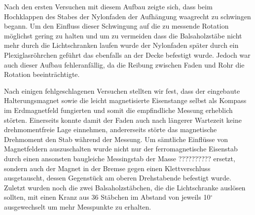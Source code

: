 \documentclass[11pt]{scrartcl}
\begin{document}
Nach den ersten Versuchen mit diesem Aufbau zeigte sich, dass beim Hochklappen des Stabes der Nylonfaden der Aufh\"angung waagrecht zu schwingen begann. Um den Einfluss dieser Schwingung auf die zu messende Rotation m\"oglichst gering zu halten und um zu vermeiden dass die Balsaholzst\"abe nicht mehr durch die Lichtschranken laufen wurde der Nylonfaden sp\"ater durch ein Plexiglasr\"ohrchen gef\"uhrt das ebenfalls an der Decke befestigt wurde. Jedoch war auch dieser Aufbau fehleranf\"allig, da die Reibung zwischen Faden und Rohr die Rotation beeintr\"achtigte.

Nach einigen fehlgeschlagenen Versuchen stellten wir fest, dass der eingebaute Halterungsmagnet sowie die leicht magnetisierte Eisenstange selbst als Kompass im Erdmagnetfeld fungierten und somit die empfindliche Messung erheblich störten.
Einerseits konnte damit der Faden auch nach längerer Wartezeit keine drehmomentfreie Lage einnehmen, andererseits störte das magnetische Drehmoment den Stab während der Messung.
Um s\"amtliche Einfl\"usse von Magnetfeldern auszuschalten wurde nicht nur der ferromagnetische Eisenstab durch einen ansonsten baugleiche Messingstab der Masse ?????????? ersetzt, sondern auch der Magnet in der Bremse gegen einen Klettverschluss ausgetauscht, dessen Gegenst\"uck am oberen Drehstabende befestigt wurde. Zuletzt wurden noch die zwei Balsaholzst\"abchen, die die Lichtschranke ausl\"osen sollten, mit einen Kranz aus 36 St\"abchen im Abstand von jeweils 10$^{\circ}$ ausgewechselt um mehr Messpunkte zu erhalten.

\end{document}
